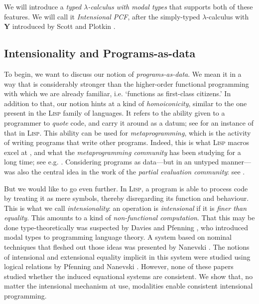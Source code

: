 \documentclass{myifcolog}
\theoremstyle{definition}
\begin{document}
\noindent We will introduce a \emph{typed $\lambda$-calculus with
modal types} that supports both of these features. We will call it
\emph{Intensional PCF}, after the simply-typed $\lambda$-calculus
with $\mathbf{Y}$ introduced by Scott \cite{Scott1993} and Plotkin
\cite{Plotkin1977}.

\subsection{Intensionality and Programs-as-data}

To begin, we want to discuss our notion of
\emph{programs-as-data}. We mean it in a way that is considerably
stronger than the higher-order functional programming with which
we are already familiar, i.e. `functions as first-class
citizens.' In addition to that, our notion hints at a kind of
\emph{homoiconicity}, similar to the one present in the
\textsc{Lisp} family of languages. It refers to the ability given
to a programmer to \emph{quote} code, and carry it around as a
datum; see \cite{Bawden1999} for an instance of that in
\textsc{Lisp}. This ability can be used for
\emph{metaprogramming}, which is the activity of writing programs
that write other programs. Indeed, this is what \textsc{Lisp}
macros excel at \cite{Graham1993}, and what the
\emph{metaprogramming community} has been studying for a long
time; see e.g. \cite{Taha2000,Tsukada2010}. Considering programs as
data---but in an untyped manner---was also the central idea in the
work of the \emph{partial evaluation community}: see
\cite{Jones1993,Jones1996,Jones1997}.

But we would like to go even further. In \textsc{Lisp}, a program
is able to process code by treating it as mere symbols, thereby
disregarding its function and behaviour. This is what we call
\emph{intensionality}: an operation is \emph{intensional} if it is
\emph{finer than equality}. This amounts to a kind of
\emph{non-functional computation}. That this may be done
type-theoretically was suspected by Davies and Pfenning
\cite{Davies2001,Davies2001a}, who introduced modal types to
programming language theory. A system based on nominal techniques
that fleshed out those ideas was presented by Nanevski
\cite{Nanevski2002}. The notions of intensional and extensional
equality implicit in this system were studied using logical
relations by Pfenning and Nanevski \cite{Nanevski2005}. However,
none of these papers studied whether the induced equational
systems are consistent. We show that, no matter the intensional
mechanism at use, modalities enable consistent intensional
programming.
\end{document}
